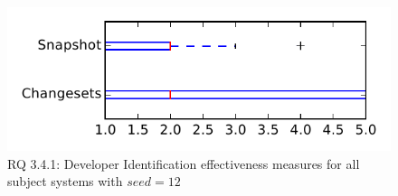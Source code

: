 
\begin{figure}
\centering
\includegraphics[height=0.4\textheight]{figures/dit_seed/rq1_tiny_12}
\caption{RQ 3.4.1: Developer Identification effectiveness measures for all subject systems with $seed=12$}
\label{fig:dit_seed:rq1:tiny}
\end{figure}
